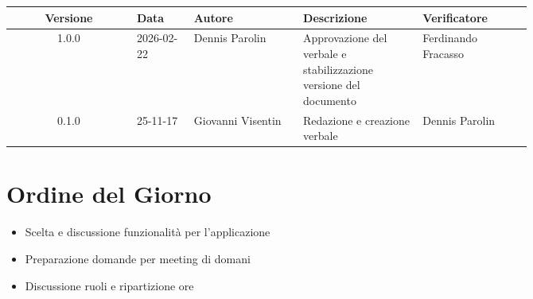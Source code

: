 \documentclass[a4paper,12pt]{article}
\begin{document}
\begin{center}
\small
\renewcommand{\arraystretch}{1.2} 
\begin{tabular}{|c|p{0.11\linewidth}|p{0.21\linewidth}|p{0.23\linewidth}|p{0.21\linewidth}|}
\hline
\rowcolor{gray!60} 
\textbf{Versione} & \textbf{Data} & \textbf{Autore} & \textbf{Descrizione} & \textbf{Verificatore} \\
\hline

\rowcolor{white}
1.0.0 & 2026-02-22 & Dennis Parolin & Approvazione del verbale e stabilizzazione versione del documento & Ferdinando Fracasso \\
\hline
\rowcolor{gray!20}
0.1.0 & 25-11-17 & Giovanni Visentin & Redazione e creazione verbale & Dennis Parolin \\
\hline
\end{tabular}
\end{center}

\clearpage
\tableofcontents
\thispagestyle{empty} %
\clearpage

\section{Ordine del Giorno}
\begin{itemize}
    \item Scelta e discussione funzionalità per l'applicazione
    \item Preparazione domande per meeting di domani
    \item Discussione ruoli e ripartizione ore
\end{itemize}

\end{document}
